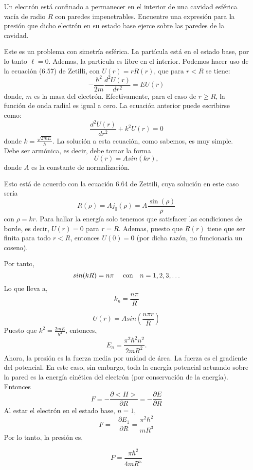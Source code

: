 \question [20]

Un electrón está confinado a permanecer en el interior de una cavidad esférica vacía de radio $R$ con paredes impenetrables. Encuentre una expresión para la presión que dicho electrón en su estado base ejerce sobre las paredes de la cavidad.

\begin{solution}
Este es un problema con simetría esférica. La partícula está en el estado base, por lo tanto $\ell =0$. Ademas, la partícula es libre en el interior.
Podemos hacer uso de la ecuación (6.57) de Zetilli, con $U(r)=rR(r)$, que para $r<R$ se tiene:
\begin{equation}
-\frac{\hbar^2}{2m}\frac{d^2 U(r)}{dr^2}=E U(r)
\end{equation} 
donde, $m$ es la masa del electrón. Efectivamente, para el caso de $r \geq R$, la función de onda radial es igual a cero. La ecuación anterior puede escribirse como:
\begin{equation}
\frac{d^2 U(r)}{dr^2}+k^2U(r)=0
\end{equation}
donde $k=\frac{\sqrt{2mE}}{\hbar}$. La solución a esta ecuación, como sabemos, es muy simple. Debe ser armónica, es decir, debe tomar la forma
\begin{equation}
U(r)=Asin(kr),
\end{equation}
donde $A$ es la constante de normalización.

Esto está de acuerdo con la ecuación 6.64 de Zettili, cuya solución en este caso sería
\begin{equation}
R(\rho) =Aj_0 (\rho)=A\frac{\sin(\rho)}{\rho}
\end{equation}
con $\rho=kr$. Para hallar la energía solo tenemos que satisfacer las condiciones de borde, es decir, $U(r)=0$ para $r=R$. Ademas, puesto que $R(r)$ tiene que ser finita para todo  $r<R$, entonces $U(0)=0$ (por dicha razón, no funcionaria un coseno).

Por tanto, 
\begin{equation}
sin(kR)=n\pi  \ \ \ \ \text{con} \quad n=1,2,3, \ldots \notag
\end{equation}
Lo que lleva  a,
\begin{equation}
k_n=\frac{n\pi}{R}
\end{equation}

$$U(r)=Asin (\frac{n\pi r}{R}) $$
Puesto que $k^2=\frac{2mE}{\hbar^2}$, entonces,
\begin{equation}
E_n=\frac{\pi^2\hbar^2n^2}{2mR^2}.
\end{equation}
Ahora, la presión es la fuerza media por unidad de área. La fuerza es el gradiente del potencial. En este caso, sin embargo, toda la energía potencial actuando sobre la pared es la energía cinética del electrón (por conservación de la energía). Entonces
\begin{equation}
F=-\frac{\partial <H>}{\partial R}=-\frac{\partial E}{\partial R}
\end{equation}
Al estar el electrón en el estado base, $n=1$,
\begin{equation}
F=- \frac{\partial E_1}{\partial R}=\frac{\pi^2 \hbar^2}{mR^3}
\end{equation}
Por lo tanto, la presión es,

\begin{equation}
P=\frac{\pi\hbar^2}{4mR^5}
\end{equation}
\end{solution}

